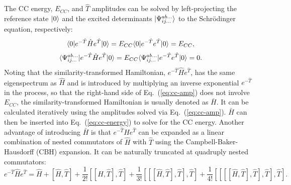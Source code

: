 The CC energy, $E_{CC}$, and $\hat{T}$ amplitudes can be solved by left-projecting the reference state $| 0 \rangle$ and the excited determinants $| \Psi_{ij...}^{ab...} \rangle$ to the Schr\"odinger equation, respectively:
\begin{equation}
\langle0 |e^{-\hat{T}}\hat{H}e^{\hat{T}} | 0 \rangle = E_{CC}\langle0 |e^{-\hat{T}}e^{\hat{T}} | 0 \rangle = E_{CC},
\label{eq:cc-energy}
\end{equation}
\begin{equation}
\langle\Psi_{ij...}^{ab...} |e^{-\hat{T}}\hat{H}e^{\hat{T}} | 0 \rangle = E_{CC}\langle\Psi_{ij...}^{ab...} |e^{-\hat{T}}e^{\hat{T}} | 0 \rangle = 0.
\label{eq:cc-amp}
\end{equation}
Noting that the similarity-transformed Hamiltonian, $e^{-\hat{T}}\hat{H}e^{\hat{T}}$, has the same eigenspectrum as $\hat{H}$ and is introduced by multiplying an inverse exponential $e^{-\hat{T}}$ in the process, so that the right-hand side of Eq.~(\ref{eq:cc-amp}) does not involve $E_{CC}$, the similarity-transformed Hamiltonian is usually denoted as $\bar{H}$. It can be calculated iteratively using the amplitudes solved via Eq.~(\ref{eq:cc-amp}). $\bar{H}$ can then be inserted into Eq.~(\ref{eq:cc-energy}) to solve for the CC energy. Another advantage of introducing $\bar{H}$ is that $e^{-\hat{T}}\hat{H}e^{\hat{T}}$ can be expanded as a linear combination of nested commutators of $\hat{H}$ with $\hat{T}$ using the Campbell-Baker-Hausdorff (CBH) expansion.\cite{Achilles2012} It can be naturally truncated at quadruply nested commutators:
\begin{equation}
e^{-\hat{T}}\hat{H}e^{\hat{T}} = \hat{H} + [\hat{H}, \hat{T}] + \frac{1}{2!}[[\hat{H}, \hat{T}], \hat{T}] + \frac{1}{3!}[[[\hat{H}, \hat{T}], \hat{T}], \hat{T}]
+ \frac{1}{4!}[[[[\hat{H}, \hat{T}], \hat{T}], \hat{T}], \hat{T}].
\label{eq:cc-cbh}
\end{equation}
